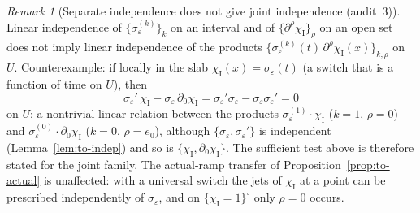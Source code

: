 \documentclass{article}
\theoremstyle{remark}
\newtheorem{remark}[proposition]{Remark}
\newcommand{\sigeps}{\sigma_\varepsilon}
\newcommand{\chiI}{\chi_{\mathrm I}}
\begin{document}
\begin{remark}[Separate independence does not give joint independence (audit~3)]
\label{rem:to-joint}
Linear independence of $\{\sigeps^{(k)}\}_k$ on an interval and of $\{\partial^\rho\chiI\}_\rho$ on an open set does not imply linear independence of the products $\{\sigeps^{(k)}(t)\,\partial^\rho\chiI(x)\}_{k,\rho}$ on $U$.
Counterexample: if locally in the slab $\chiI(x)=\sigeps(t)$ (a switch that is a function of time on $U$), then
\[
\sigeps'\,\chiI-\sigeps\,\partial_0\chiI=\sigeps'\sigeps-\sigeps\sigeps'=0
\]
on $U$: a nontrivial linear relation between the products $\sigeps^{(1)}\cdot\chiI$ ($k=1$, $\rho=0$) and $\sigeps^{(0)}\cdot\partial_0\chiI$ ($k=0$, $\rho=e_0$), although $\{\sigeps,\sigeps'\}$ is independent (Lemma~\ref{lem:to-indep}) and so is $\{\chiI,\partial_0\chiI\}$.
The sufficient test above is therefore stated for the joint family.
The actual-ramp transfer of Proposition~\ref{prop:to-actual} is unaffected: with a universal switch the jets of $\chiI$ at a point can be prescribed independently of $\sigeps$, and on $\{\chiI=1\}^\circ$ only $\rho=0$ occurs.
\end{remark}
\end{document}
